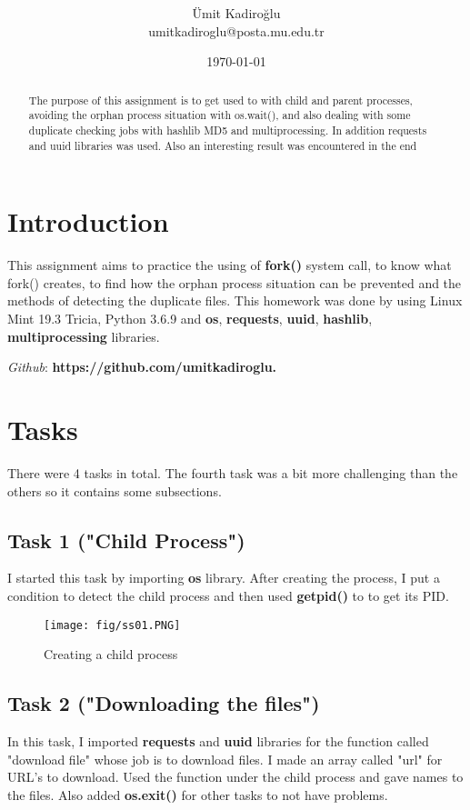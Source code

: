 \documentclass[onecolumn]{article}
\title{\spacecaps{Assignment Report 2: Implementation of Fork and Multiprocessing Synchronization}\\ \normalsize \spacesc{CENG2034, Operating Systems} }
\author{Ümit Kadiroğlu\\umitkadiroglu@posta.mu.edu.tr}
\date{\today}
\begin{document}
\maketitle

\begin{abstract}
The purpose of this assignment is to get used to with child and parent processes, avoiding the orphan process situation with os.wait(), and also dealing with some duplicate checking jobs with hashlib MD5 and multiprocessing. In addition requests and uuid libraries was used. Also an interesting result was encountered in the end
\end{abstract}
\section{Introduction}

This assignment aims to practice the using of\textbf{ fork()} system call, to know what fork() creates, to find how the orphan process situation can be prevented and the methods of detecting the duplicate files. This homework was done by using Linux Mint 19.3 Tricia, Python 3.6.9 and \textbf{os}, \textbf{requests}, \textbf{uuid}, \textbf{hashlib}, \textbf{multiprocessing} libraries.

\textit{Github}: \textbf{https://github.com/umitkadiroglu.}


\section{Tasks}
There were 4 tasks in total. The fourth task was a bit more challenging than the others so it contains some subsections.

\subsection{Task 1 ("Child Process")}
I started this task by importing \textbf{os} library. After creating the process, I put a condition to detect the child process and then used \textbf{getpid()} to to get its PID.

\begin{figure}[H]
\centering
\texttt{[image: fig/ss01.PNG]}
\caption{Creating a child process}
\end{figure}
    
\subsection{Task 2 ("Downloading the files")}
In this task, I imported \textbf{requests} and \textbf{uuid} libraries for the function called "download file" whose job is to download files. I made an array called "url" for URL's to download. Used the function under the child process and gave names to the files. Also added \textbf{os.exit()} for other tasks to not have problems.
\end{document}
